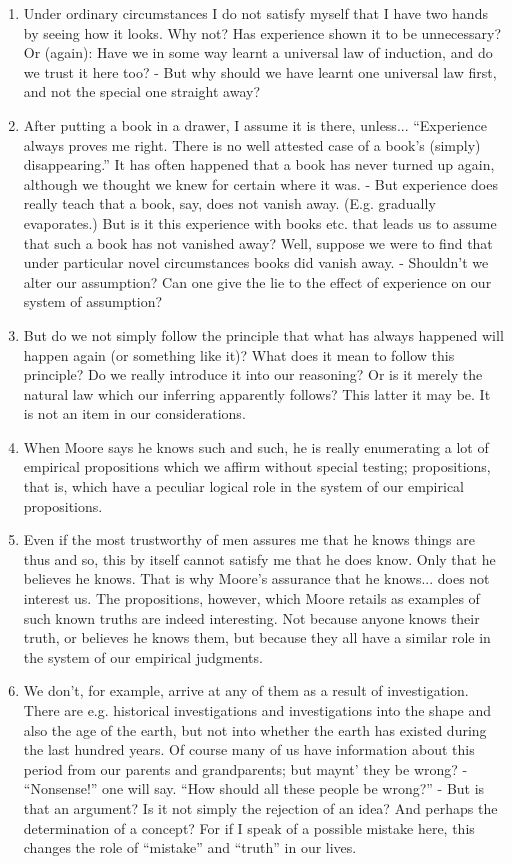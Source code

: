 \documentclass{book}
\begin{document}
\begin{enumerate}
\item
Under ordinary circumstances I do not satisfy myself that I have two hands by
seeing how it looks. Why not? Has experience shown it to be unnecessary? Or
(again): Have we in some way learnt a universal law of induction, and do we
trust it here too? - But why should we have learnt one universal law first, and
not the special one straight away?

\item
After putting a book in a drawer, I assume it is there, unless... ``Experience
always proves me right. There is no well attested case of a book's (simply)
disappearing.'' It has often happened that a book has never turned up again,
although we thought we knew for certain where it was. - But experience does
really teach that a book, say, does not vanish away. (E.g. gradually
evaporates.) But is it this experience with books etc. that leads us to assume
that such a book has not vanished away? Well, suppose we were to find that
under particular novel circumstances books did vanish away. - Shouldn't we
alter our assumption? Can one give the lie to the effect of experience on our
system of assumption?

\item
But do we not simply follow the principle that what has always happened will
happen again (or something like it)? What does it mean to follow this
principle? Do we really introduce it into our reasoning? Or is it merely the
natural law which our inferring apparently follows? This latter it may be. It
is not an item in our considerations.

\item
When Moore says he knows such and such, he is really enumerating a lot of
empirical propositions which we affirm without special testing; propositions,
that is, which have a peculiar logical role in the system of our empirical
propositions.

\item
Even if the most trustworthy of men assures me that he knows things are thus
and so, this by itself cannot satisfy me that he does know. Only that he
believes he knows. That is why Moore's assurance that he knows... does not
interest us. The propositions, however, which Moore retails as examples of such
known truths are indeed interesting. Not because anyone knows their truth, or
believes he knows them, but because they all have a similar role in the system
of our empirical judgments.

\item
We don't, for example, arrive at any of them as a result of investigation.
There are e.g. historical investigations and investigations into the shape and
also the age of the earth, but not into whether the earth has existed during
the last hundred years. Of course many of us have information about this period
from our parents and grandparents; but maynt' they be wrong? - ``Nonsense!''
one will say. ``How should all these people be wrong?'' - But is that an
argument? Is it not simply the rejection of an idea? And perhaps the
determination of a concept? For if I speak of a possible mistake here, this
changes the role of ``mistake'' and ``truth'' in our lives.


\end{enumerate}
\end{document}
